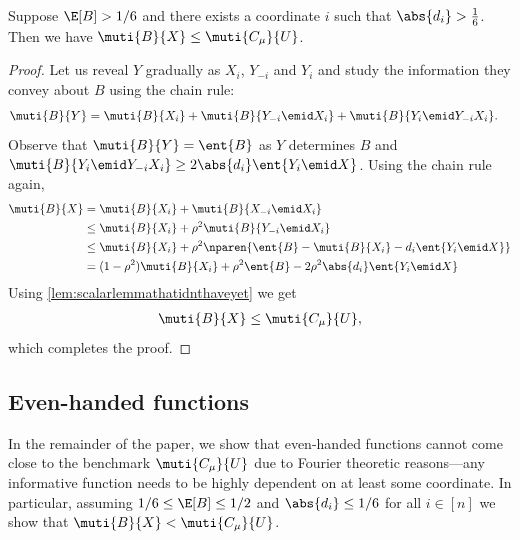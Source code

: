\begin{lemma}
\label{lem:high-corr}
Suppose $\E[B]>1/6$ and there exists a coordinate $i$
such that $\abs{d_i}> \frac{1}{6}$. 
Then we have $\muti{B}{X}\le\muti{C_\mu}{U}$.
\end{lemma}
\begin{proof}
Let us reveal $Y$ gradually as $X_i$, $Y_{-i}$ and
$Y_i$ and study the information they convey about $B$
using the chain rule:
\begin{align*}
\muti{B}{Y} &= \muti{B}{X_i} + \muti{B}{Y_{-i}\emid X_i}
  + \muti{B}{Y_i\emid Y_{-i}X_i}.
\end{align*}
Observe that $\muti{B}{Y}=\ent{B}$ as $Y$ determines $B$ and
$\muti{B}{Y_i\emid Y_{-i}X_i}\ge 2\abs{d_i} \ent{Y_i\emid X}$.
Using the chain rule again,
\begin{align*}
\muti{B}{X}
  &=   \muti{B}{X_i} + \muti{B}{X_{-i}\emid X_i}\\
  &\le \muti{B}{X_i} + \rho^2 \muti{B}{Y_{-i}\emid X_i}\\
  &\le \muti{B}{X_i} + \rho^2 \nparen{\ent{B}
    - \muti{B}{X_i}-d_i \ent{Y_i \emid X}}\\
  &=   (1-\rho^2)\muti{B}{X_i} + \rho^2 \ent{B}
    - 2\rho^2\abs{d_i} \ent{Y_i\emid X}
\end{align*}
Using \autoref{lem:scalarlemmathatidnthaveyet} we get
\begin{align*}
\muti{B}{X} \le \muti{C_\mu}{U},
\end{align*}
which completes the proof.
\end{proof}

\subsection{Even-handed functions}
\label{sec:well-rounded}
In the remainder of the paper, we show that even-handed
functions cannot come close to the benchmark $\muti{C_\mu}{U}$
due to Fourier theoretic reasons---any informative function
needs to be highly dependent on at least some coordinate.
In particular, assuming $1/6\le \E[B]\le1/2$ and
$\abs{d_i}\le 1/6$ for all $i\in[n]$ we show that
$\muti{B}{X}<\muti{C_\mu}{U}$.


